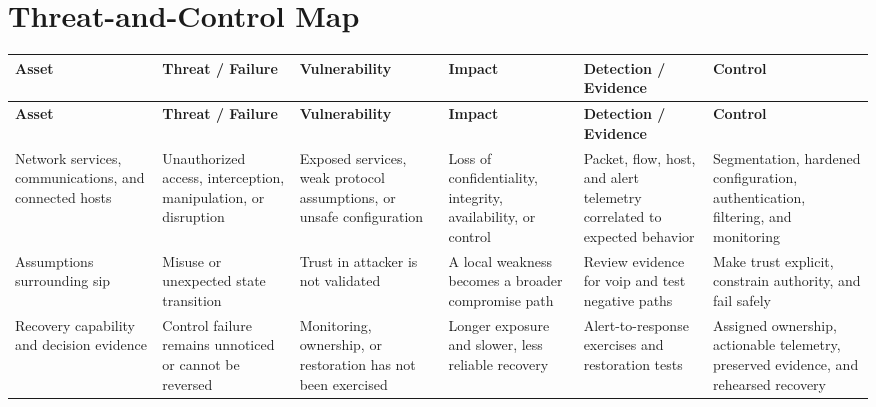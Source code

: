 \documentclass[11pt]{article}
\begin{document}
\section*{Threat-and-Control Map}
\begingroup\scriptsize\setlength{\tabcolsep}{2pt}
\begin{longtable}{>{\RaggedRight\arraybackslash}p{}>{\RaggedRight\arraybackslash}p{}>{\RaggedRight\arraybackslash}p{}>{\RaggedRight\arraybackslash}p{}>{\RaggedRight\arraybackslash}p{}>{\RaggedRight\arraybackslash}p{}}
\toprule\rowcolor{Navy}\color{white}\textbf{Asset} & \color{white}\textbf{Threat / Failure} & \color{white}\textbf{Vulnerability} & \color{white}\textbf{Impact} & \color{white}\textbf{Detection / Evidence} & \color{white}\textbf{Control}\\\midrule
\endfirsthead
\toprule\rowcolor{Navy}\color{white}\textbf{Asset} & \color{white}\textbf{Threat / Failure} & \color{white}\textbf{Vulnerability} & \color{white}\textbf{Impact} & \color{white}\textbf{Detection / Evidence} & \color{white}\textbf{Control}\\\midrule
\endhead
Network services, communications, and connected hosts & Unauthorized access, interception, manipulation, or disruption & Exposed services, weak protocol assumptions, or unsafe configuration & Loss of confidentiality, integrity, availability, or control & Packet, flow, host, and alert telemetry correlated to expected behavior & Segmentation, hardened configuration, authentication, filtering, and monitoring\\\midrule
Assumptions surrounding sip & Misuse or unexpected state transition & Trust in attacker is not validated & A local weakness becomes a broader compromise path & Review evidence for voip and test negative paths & Make trust explicit, constrain authority, and fail safely\\\midrule
Recovery capability and decision evidence & Control failure remains unnoticed or cannot be reversed & Monitoring, ownership, or restoration has not been exercised & Longer exposure and slower, less reliable recovery & Alert-to-response exercises and restoration tests & Assigned ownership, actionable telemetry, preserved evidence, and rehearsed recovery\\\midrule
\bottomrule
\end{longtable}
\endgroup
\end{document}

